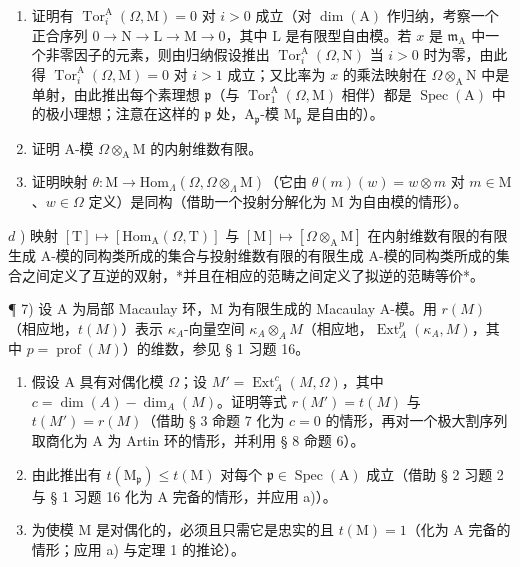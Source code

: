 \begin{enumerate}
\def\labelenumi{\alph{enumi})}
\item
  证明有 \(\operatorname{Tor}_{i}^{\mathrm{A}}(\Omega, \mathrm{M}) = 0\) 对 \(i > 0\) 成立（对 \(\dim(\mathrm{A})\) 作归纳，考察一个正合序列 \(0 \to \mathrm{N} \to \mathrm{L} \to \mathrm{M} \to 0\)，其中 \(\mathrm{L}\) 是有限型自由模。若 \(x\) 是 \(\mathfrak{m}_{\mathrm{A}}\) 中一个非零因子的元素，则由归纳假设推出 \(\operatorname{Tor}_{i}^{\mathrm{A}}(\Omega, \mathrm{N})\) 当 \(i > 0\) 时为零，由此得 \(\operatorname{Tor}_{i}^{\mathrm{A}}(\Omega, \mathrm{M}) = 0\) 对 \(i > 1\) 成立；又比率为 \(x\) 的乘法映射在 \(\Omega \otimes_{\mathrm{A}} \mathrm{N}\) 中是单射，由此推出每个素理想 \(\mathfrak{p}\)（与 \(\operatorname{Tor}_{1}^{\mathrm{A}}(\Omega, \mathrm{M})\) 相伴）都是 \(\operatorname{Spec}(\mathrm{A})\) 中的极小理想；注意在这样的 \(\mathfrak{p}\) 处，\(\mathrm{A}_{\mathfrak{p}}\)-模 \(\mathrm{M}_{\mathfrak{p}}\) 是自由的）。
\item
  证明 A-模 \(\Omega\otimes_{\mathrm{A}}\mathrm{M}\) 的内射维数有限。
\item
  证明映射 \(\theta: \mathrm{M} \to \mathrm{Hom}_{\Lambda}(\Omega, \Omega \otimes_{\Lambda} \mathrm{M})\)（它由 \(\theta(m)(w) = w \otimes m\) 对 \(m \in \mathrm{M}\)、\(w \in \Omega\) 定义）是同构（借助一个投射分解化为 M 为自由模的情形）。
\end{enumerate}

\(d\) ) 映射 \([\mathrm{T}] \mapsto [\mathrm{Hom}_{\mathrm{A}}(\Omega, \mathrm{T})]\) 与 \([\mathrm{M}] \mapsto [\Omega \otimes_{\mathrm{A}} \mathrm{M}]\) 在内射维数有限的有限生成 A-模的同构类所成的集合与投射维数有限的有限生成 A-模的同构类所成的集合之间定义了互逆的双射，*并且在相应的范畴之间定义了拟逆的范畴等价*。

¶ 7) 设 A 为局部 Macaulay 环，M 为有限生成的 Macaulay A-模。用 \(r(M)\)（相应地，\(t(M)\)）表示 \(\kappa_{A}\)-向量空间 \(\kappa_{A} \otimes_{A} M\)（相应地，\(\operatorname{Ext}_{A}^{p}(\kappa_{A}, M)\)，其中 \(p = \operatorname{prof}(M)\)）的维数，参见 § 1 习题 16。

\begin{enumerate}
\def\labelenumi{\alph{enumi})}
\item
  假设 A 具有对偶化模 \(\Omega\)；设 \(M' = \operatorname{Ext}_A^c(M, \Omega)\)，其中 \(c = \dim(A) - \dim_A(M)\)。证明等式 \(r(M') = t(M)\) 与 \(t(M') = r(M)\)（借助 § 3 命题 7 化为 \(c = 0\) 的情形，再对一个极大割序列取商化为 A 为 Artin 环的情形，并利用 § 8 命题 6）。
\item
  由此推出有 \(t(\mathrm{M}_{\mathfrak{p}}) \leqslant t(\mathrm{M})\) 对每个 \(\mathfrak{p} \in \operatorname{Spec}(\mathrm{A})\) 成立（借助 § 2 习题 2 与 § 1 习题 16 化为 A 完备的情形，并应用 a)）。
\item
  为使模 M 是对偶化的，必须且只需它是忠实的且 \(t(\mathrm{M}) = 1\)（化为 A 完备的情形；应用 a) 与定理 1 的推论）。
\end{enumerate}

